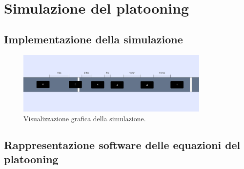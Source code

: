 \section{Simulazione del platooning}

\subsection{Implementazione della simulazione}

\begin{figure}[H]
    \centering
    \includegraphics[width=0.85\textwidth, keepaspectratio]{images/3-simulation/simulation-view.png}
    \caption{Visualizzazione grafica della simulazione.}
    \label{fig:simulation-view}
\end{figure}

\newpage
\subsection{Rappresentazione software delle equazioni del platooning}
